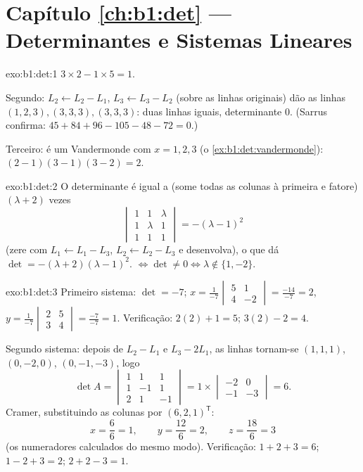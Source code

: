 \section*{Capítulo \ref{ch:b1:det} --- Determinantes e Sistemas Lineares}

\begin{solution}{exo:b1:det:1}
$3 \times 2 - 1 \times 5 = 1$.

Segundo: $L_2 \leftarrow L_2 - L_1$, $L_3 \leftarrow L_3 - L_2$ (sobre as linhas originais) dão as linhas
$(1,2,3), (3,3,3), (3,3,3)$: duas linhas iguais, determinante $0$. (Sarrus confirma:
$45 + 84 + 96 - 105 - 48 -
72 = 0$.)

Terceiro: é um Vandermonde com $x = 1, 2, 3$ (o \cref{ex:b1:det:vandermonde}): $(2-1)(3-1)(3-2) = 2$.
\end{solution}

\begin{solution}{exo:b1:det:2}
O determinante é igual a (some todas as colunas à primeira e
fatore) $(\lambda + 2)$ vezes
\[
\begin{vmatrix}
1 & 1 & \lambda\\ 1 & \lambda & 1\\ 1 & 1 & 1
\end{vmatrix}
= -(\lambda - 1)^2
\]
(zere com $L_1 \leftarrow L_1 - L_3$, $L_2 \leftarrow L_2 - L_3$ e desenvolva), o que dá $\det = -(\lambda+2)(\lambda-1)^2$.  $\iff \det \neq 0 \iff \lambda \notin \{1, -2\}$.
\end{solution}

\begin{solution}{exo:b1:det:3}
Primeiro sistema: $\det = -7$; $x = \frac{1}{-7}\begin{vmatrix} 5 & 1\\ 4 & -2\end{vmatrix}
= \frac{-14}{-7} = 2$, $y = \frac{1}{-7}\begin{vmatrix} 2 & 5\\ 3 & 4\end{vmatrix}
= \frac{-7}{-7} = 1$. Verificação: $2(2) + 1 = 5$; $3(2) - 2 = 4$.

Segundo sistema: depois de $L_2 - L_1$ e $L_3 - 2L_1$, as linhas tornam-se
$(1,1,1)$, $(0,-2,0)$, $(0,-1,-3)$, logo
\[
\det A = \begin{vmatrix} 1&1&1\\ 1&-1&1\\ 2&1&-1\end{vmatrix}
= 1 \times \begin{vmatrix} -2 & 0\\ -1 & -3\end{vmatrix} = 6 .
\]
Cramer, substituindo as colunas por $(6,2,1)^{\mathsf T}$:
\[
x = \frac{6}{6} = 1, \qquad
y = \frac{12}{6} = 2, \qquad
z = \frac{18}{6} = 3
\]
(os numeradores calculados do mesmo modo). Verificação: $1 + 2 + 3 = 6$;
$1 -
2 + 3 = 2$; $2 + 2 - 3 = 1$.
\end{solution}

